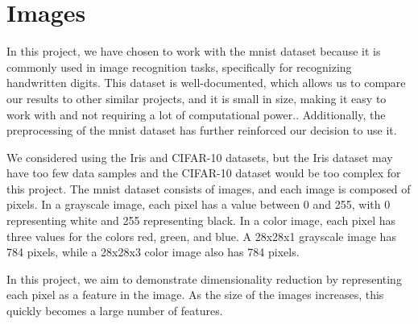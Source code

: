 \section{Images}\label{sec:images}


In this project, we have chosen to work with the \gls{mnist} dataset because it is commonly used in image recognition tasks, specifically for recognizing handwritten digits. This dataset is well-documented, which allows us to compare our results to other similar projects, and it is small in size, making it easy to work with and not requiring a lot of computational power\cite{lecun-mnist-database}.. Additionally, the preprocessing of the \gls{mnist} dataset has further reinforced our decision to use it.

We considered using the Iris and CIFAR-10 datasets, but the Iris dataset may have too few data samples \cite{mnist-vs-iris} and the CIFAR-10 dataset would be too complex for this project\cite{datasets-uniqtech}. The \gls{mnist} dataset consists of images, and each image is composed of pixels. In a grayscale image, each pixel has a value between 0 and 255, with 0 representing white and 255 representing black. In a color image, each pixel has three values for the colors red, green, and blue. A 28x28x1 grayscale image has 784 pixels, while a 28x28x3 color image also has 784 pixels.

In this project, we aim to demonstrate dimensionality reduction by representing each pixel as a feature in the image. As the size of the images increases, this quickly becomes a large number of features.